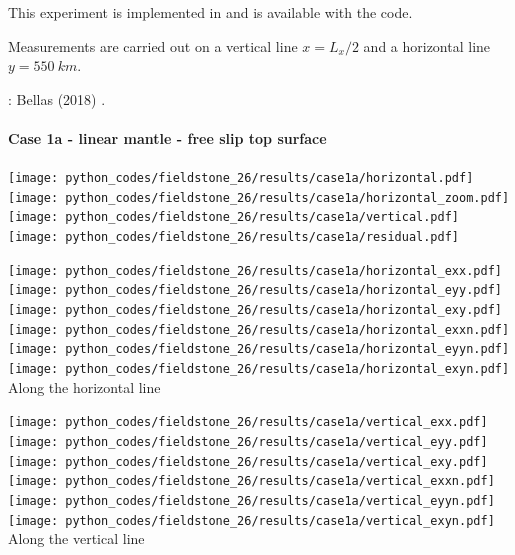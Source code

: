 This experiment is implemented in \aspect and is available with the code. 

Measurements are carried out on a vertical line $x=L_x/2$ and a horizontal line $y=550~\si{km}$.

\Literature: Bellas \etal (2018) \cite{bezb18}.

\newpage
\paragraph{Case 1a - linear mantle - free slip top surface} 

\begin{center}
\texttt{[image: python\_codes/fieldstone\_26/results/case1a/horizontal.pdf]}
\texttt{[image: python\_codes/fieldstone\_26/results/case1a/horizontal\_zoom.pdf]}\\
\texttt{[image: python\_codes/fieldstone\_26/results/case1a/vertical.pdf]}
\texttt{[image: python\_codes/fieldstone\_26/results/case1a/residual.pdf]}
\end{center}

\begin{center}
\texttt{[image: python\_codes/fieldstone\_26/results/case1a/horizontal\_exx.pdf]}
\texttt{[image: python\_codes/fieldstone\_26/results/case1a/horizontal\_eyy.pdf]}
\texttt{[image: python\_codes/fieldstone\_26/results/case1a/horizontal\_exy.pdf]}\\
\texttt{[image: python\_codes/fieldstone\_26/results/case1a/horizontal\_exxn.pdf]}
\texttt{[image: python\_codes/fieldstone\_26/results/case1a/horizontal\_eyyn.pdf]}
\texttt{[image: python\_codes/fieldstone\_26/results/case1a/horizontal\_exyn.pdf]}\\
{\captionfont Along the horizontal line}
\end{center}

\begin{center}
\texttt{[image: python\_codes/fieldstone\_26/results/case1a/vertical\_exx.pdf]}
\texttt{[image: python\_codes/fieldstone\_26/results/case1a/vertical\_eyy.pdf]}
\texttt{[image: python\_codes/fieldstone\_26/results/case1a/vertical\_exy.pdf]}\\
\texttt{[image: python\_codes/fieldstone\_26/results/case1a/vertical\_exxn.pdf]}
\texttt{[image: python\_codes/fieldstone\_26/results/case1a/vertical\_eyyn.pdf]}
\texttt{[image: python\_codes/fieldstone\_26/results/case1a/vertical\_exyn.pdf]}\\
{\captionfont Along the vertical line}
\end{center}


